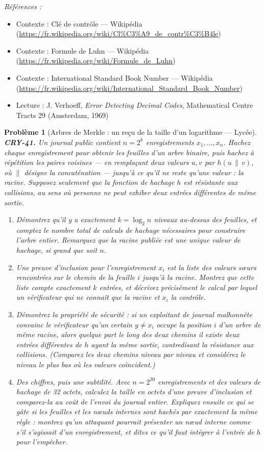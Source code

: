 \documentclass[11pt]{article}
\newtheorem{problem}{Problème}
\newenvironment{refs}{\par\small\noindent\emph{Références :}\begin{itemize}\setlength\itemsep{0pt}}{\end{itemize}\normalsize}
\begin{document}
\begin{refs}
\item Contexte : Clé de contrôle --- Wikipédia (\url{https://fr.wikipedia.org/wiki/Cl%C3%A9_de_contr%C3%B4le})
\item Contexte : Formule de Luhn --- Wikipédia (\url{https://fr.wikipedia.org/wiki/Formule_de_Luhn})
\item Contexte : International Standard Book Number --- Wikipédia (\url{https://fr.wikipedia.org/wiki/International_Standard_Book_Number})
\item Lecture : J. Verhoeff, \textit{Error Detecting Decimal Codes}, Mathematical Centre Tracts 29 (Amsterdam, 1969)
\end{refs}

\bigskip

\begin{problem}[{Arbres de Merkle : un reçu de la taille d'un logarithme --- Lycée}]
\textbf{CRY-41.} Un journal public contient $n = 2^k$ enregistrements $x_1, \dots, x_n$.
Hachez chaque enregistrement pour obtenir les feuilles d'un arbre binaire, puis hachez à
répétition les paires voisines --- en remplaçant deux valeurs $u, v$ par $h(u \,\|\, v)$,
où $\|$ désigne la concaténation --- jusqu'à ce qu'il ne reste qu'une valeur : la
\textit{racine}. Supposez seulement que la fonction de hachage $h$ est \textit{résistante aux
collisions}, au sens où personne ne peut exhiber deux entrées différentes de même
sortie.
\begin{enumerate}
\item[(a)] Démontrez qu'il y a exactement $k = \log_2 n$ niveaux au-dessus des feuilles, et
comptez le nombre total de calculs de hachage nécessaires pour construire l'arbre entier.
Remarquez que la racine publiée est une unique valeur de hachage, si grand que soit $n$.
\item[(b)] Une \textit{preuve d'inclusion} pour l'enregistrement $x_i$ est la liste des valeurs
s\oe{}urs rencontrées sur le chemin de la feuille $i$ jusqu'à la racine. Montrez que cette
liste compte exactement $k$ entrées, et décrivez précisément le calcul par lequel un
vérificateur qui ne connaît que la racine et $x_i$ la contrôle.
\item[(c)] Démontrez la propriété de sécurité : si un exploitant de journal malhonnête convainc le
vérificateur qu'un certain $y \ne x_i$ occupe la position $i$ d'un arbre de \textit{même}
racine, alors quelque part le long des deux chemins il existe deux entrées différentes de
$h$ ayant la même sortie, contredisant la résistance aux collisions. (Comparez les deux
chemins niveau par niveau et considérez le niveau le plus bas où les valeurs coïncident.)
\item[(d)] Des chiffres, puis une subtilité. Avec $n = 2^{30}$ enregistrements et des valeurs de
hachage de 32 octets, calculez la taille en octets d'une preuve d'inclusion et comparez-la au
coût de l'envoi du journal entier. Expliquez ensuite ce qui se gâte si les feuilles et les
n\oe{}uds internes sont hachés par exactement la même règle : montrez qu'un attaquant pourrait
présenter un n\oe{}ud interne comme s'il s'agissait d'un enregistrement, et dites ce qu'il faut
intégrer à l'entrée de $h$ pour l'empêcher.
\end{enumerate}


\end{problem}
\end{document}
